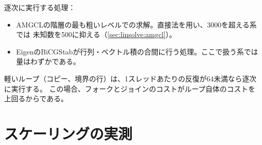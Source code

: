 逐次に実行する処理：

\begin{itemize}
  \item AMGCLの階層の最も粗いレベルでの求解。直接法を用い、3000を超える系では
    未知数を500に抑える（\cref{sec:linsolve:amgcl}）。
  \item EigenのBiCGStabが行列・ベクトル積の合間に行う処理。ここで扱う系では量はわずかである。
\end{itemize}

軽いループ（コピー、境界の行）は、1スレッドあたりの反復が64未満なら逐次に実行する。
この場合、フォークとジョインのコストがループ自体のコストを上回るからである。

\section{スケーリングの実測}
\label{sec:parallel:scaling}

